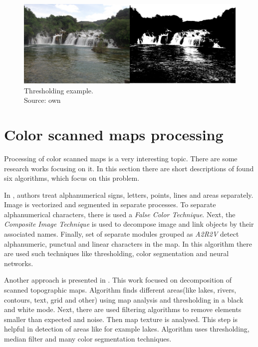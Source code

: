 \documentclass[a4paper,onecolumn,oneside,12pt]{memoir}
\begin{document}
\begin{figure}[ht]
\begin{center}
\includegraphics[scale=0.15]{images/thresholdingExample.jpg}
\caption{Thresholding example. \\
Source: own}
\label{thresholdingExample}
\end{center}
\end{figure}

\section{Color scanned maps processing}

Processing of color scanned maps is a very interesting topic. There are some research works focusing
on it. In this section there are short descriptions of found six algorithms, which focus on this
problem.

In \cite{semanticAnalysisAndRecognition}, authors treat alphanumerical signs, letters, points, lines
and areas separately. Image is vectorized and segmented in separate processes. To separate 
alphanumerical characters, there is used a \textit{False Color Technique}. Next, the 
\textit{Composite Image Technique} is used to decompose image and link objects by their associated
names. Finally, set of separate modules grouped as \textit{A2R2V} detect alphanumeric, punctual and
linear characters in the map. In this algorithm there are used such techniques like thresholding,
color segmentation and neural networks.

Another approach is presented in \cite{comparativeAnalysisOfScannedMaps}. This work focused on 
decomposition of scanned topographic maps. Algorithm finds different areas(like lakes, rivers,
contours, text, grid and other) using map analysis and thresholding in a black and white mode.
Next, there are used filtering algorithms to remove elements smaller than expected and noise.
Then map texture is analysed. This step is helpful in detection of areas like for example lakes.
Algorithm uses thresholding, median filter and many color segmentation techniques.
\end{document}
